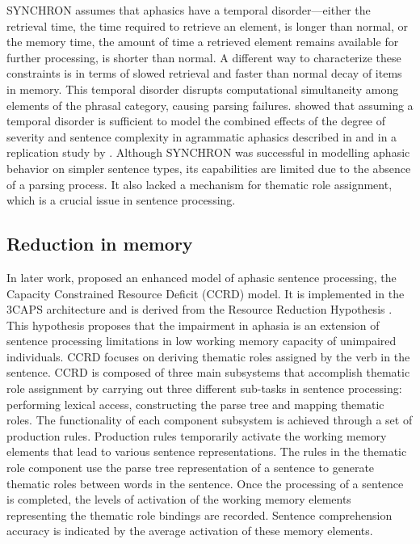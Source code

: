 \documentclass{cambridge7A}\usepackage[]{graphicx}\usepackage[]{color}
\begin{document}
SYNCHRON  assumes that aphasics have a temporal disorder---either the retrieval time, the time required to retrieve an element, is longer than normal, or the memory time, the amount of time a retrieved element remains available for further processing, is shorter than normal. 
A different way to characterize these constraints is in terms of slowed retrieval and faster than normal decay of items in memory.
This temporal disorder disrupts computational simultaneity among elements of the phrasal category, causing parsing failures. \cite{Haarmann-Kolk-1991} showed that assuming a temporal disorder is sufficient to model the combined effects of the degree of severity and sentence complexity in agrammatic aphasics described in \cite{Schwartz-EtAl-1980} and in a replication study by \cite{Kolk-vanGrunsven-1985}. Although SYNCHRON was successful in modelling aphasic behavior on simpler sentence types, its capabilities are limited due to the absence of a parsing process. It also lacked a mechanism for thematic role assignment, which is a crucial issue in sentence processing.


\subsection{Reduction in memory}
In later work, 
\cite{Haarmann-EtAl-1997} proposed an enhanced model of aphasic sentence processing, the  Capacity Constrained Resource Deficit (CCRD) model. It is implemented in the  3CAPS architecture  \citep{Just1980} and is derived from the Resource Reduction Hypothesis \citep{Miyake-EtAl-1994}. This hypothesis proposes that the impairment in aphasia is an extension of sentence processing limitations in low working memory capacity of unimpaired individuals. CCRD focuses on deriving thematic roles assigned by the verb in the sentence. CCRD is composed of three main subsystems that accomplish thematic role assignment by carrying out three different sub-tasks in sentence processing: performing lexical access, constructing the parse tree and mapping thematic roles. The functionality of each component subsystem is achieved through a set of production rules. Production rules temporarily activate the working memory elements that lead to various sentence representations. The rules in the thematic role component use the parse tree representation of a sentence to generate thematic roles between words in the sentence. Once the processing of a sentence is completed, the levels of activation of the working memory elements representing the thematic role bindings are recorded. Sentence comprehension accuracy is indicated by the average activation of these memory elements. 
\end{document}
